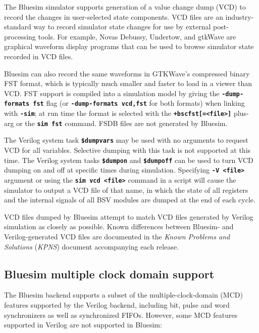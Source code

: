 \documentclass{article}
\begin{document}
The Bluesim simulator supports generation of a value
change dump (VCD) to record the changes in user-selected state
components.  VCD files are an industry-standard way to record
simulator state changes for use by external post-processing tools. For
example, Novas Debussy, Undertow, and gtkWave are graphical waveform
display programs that can be used to browse simulator state recorded
in VCD files.

Bluesim can also record the same waveforms in GTKWave's compressed
binary FST format, which is typically much smaller and faster to load
in a viewer than VCD.  FST support is compiled into a simulation
model by giving the {\bf\tt -dump-formats fst} flag (or
{\bf\tt -dump-formats vcd,fst} for both formats) when linking with
{\bf\tt -sim}; at run time the format is selected with the
{\bf\tt +bscfst[=<file>]} plus-arg or the {\bf\tt sim fst} command.
FSDB files are not generated by Bluesim.

The Verilog system task {\bf\tt \$dumpvars} may be used with no arguments
to request VCD for all variables.  Selective dumping with this task
is not supported at this time.  The Verilog system tasks {\bf\tt \$dumpon}
and {\bf\tt \$dumpoff} can be used to turn VCD dumping on and off at
specific times during simulation.
Specifying {\bf\tt -V <file>} argument or using the {\bf\tt sim vcd <file>}
command in a script will cause the simulator to output a
VCD file of that name, in which the state of all registers
and the internal signals of all BSV modules are dumped at the end of
each cycle.

VCD files dumped by Bluesim attempt to match VCD files generated by
Verilog simulation as closely as possible.  Known differences between
Bluesim- and Verilog-generated VCD files are documented in the
\textit{Known Problems and Solutions} (\textit{KPNS}) document
accompanying each release.


\subsection{Bluesim multiple clock domain support}

The Bluesim backend supports a subset of the multiple-clock-domain
(MCD) features supported by the Verilog backend, including bit, pulse
and word synchronizers as well as synchronized FIFOs.  However, some
MCD features supported in Verilog are not supported in Bluesim:
\end{document}
